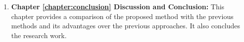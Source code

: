 \begin{enumerate}
    \item \textbf{Chapter \ref{chapter:conclusion} Discussion and Conclusion:} This chapter provides a comparison of the proposed method with the previous methods and its advantages over the previous approaches. It also concludes the research work. 
\end{enumerate}

